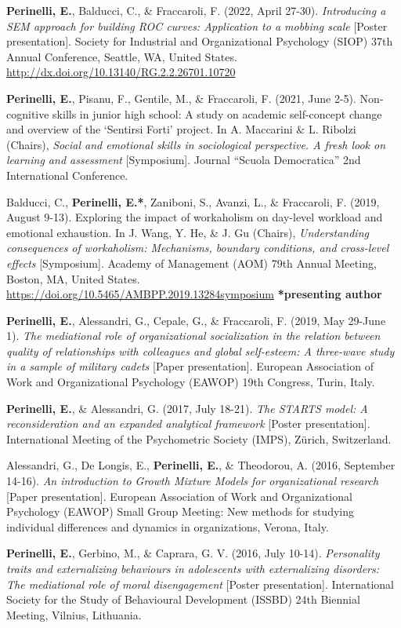\documentclass[hidelinks, letterpaper,10pt]{article} %
\begin{document}
\begin{etaremune}
   \item \textbf{Perinelli, E.}, Balducci, C., \& Fraccaroli, F. (2022, April 27-30). \textit{Introducing a SEM approach for building ROC curves: Application to a mobbing scale} [Poster presentation]. Society for Industrial and Organizational Psychology (SIOP) 37th Annual Conference, Seattle, WA, United States. \url{http://dx.doi.org/10.13140/RG.2.2.26701.10720} 

    \item \textbf{Perinelli, E.}, Pisanu, F., Gentile, M., \& Fraccaroli, F. (2021, June 2-5). Non-cognitive skills in junior high school: A study on academic self-concept change and overview of the ‘Sentirsi Forti’ project. In A. Maccarini \& L. Ribolzi (Chairs), \textit{Social and emotional skills in sociological perspective. A fresh look on learning and assessment} [Symposium]. Journal “Scuola Democratica” 2nd International Conference.

    \item Balducci, C., \textbf{Perinelli, E.*}, Zaniboni, S., Avanzi, L., \& Fraccaroli, F. (2019, August 9-13). Exploring the impact of workaholism on day-level workload and emotional exhaustion. In J. Wang, Y. He, \& J. Gu (Chairs), \textit{Understanding consequences of workaholism: Mechanisms, boundary conditions, and cross-level effects} [Symposium]. Academy of Management (AOM) 79th Annual Meeting, Boston, MA, United States. \url{https://doi.org/10.5465/AMBPP.2019.13284symposium}   \textbf{*presenting author}

    \item \textbf{Perinelli, E.}, Alessandri, G., Cepale, G., \& Fraccaroli, F. (2019, May 29-June 1). \textit{The mediational role of organizational socialization in the relation between quality of relationships with colleagues and global self-esteem: A three-wave study in a sample of military cadets} [Paper presentation]. European Association of Work and Organizational Psychology (EAWOP) 19th Congress, Turin, Italy.

    \item \textbf{Perinelli, E.}, \& Alessandri, G. (2017, July 18-21). \textit{The STARTS model: A reconsideration and an expanded analytical framework} [Poster presentation]. International Meeting of the Psychometric Society (IMPS), Zürich, Switzerland.

    \item Alessandri, G., De Longis, E., \textbf{Perinelli, E.}, \& Theodorou, A. (2016, September 14-16). \textit{An introduction to Growth Mixture Models for organizational research} [Paper presentation]. European Association of Work and Organizational Psychology (EAWOP) Small Group Meeting: New methods for studying individual differences and dynamics in organizations, Verona, Italy.

    \item \textbf{Perinelli, E.}, Gerbino, M., \& Caprara, G. V. (2016, July 10-14). \textit{Personality traits and externalizing behaviours in adolescents with externalizing disorders: The mediational role of moral disengagement} [Poster presentation]. International Society for the Study of Behavioural Development (ISSBD) 24th Biennial Meeting, Vilnius, Lithuania.
\end{etaremune}
\end{document}
